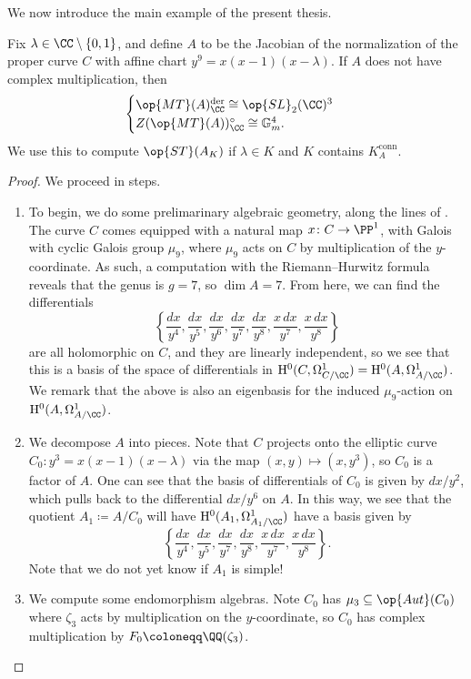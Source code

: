 \documentclass[../thesis.tex]{subfiles}
\begin{document}
We now introduce the main example of the present thesis.
\begin{proposition} \label{prop:generic-fermat-st}
	Fix $\lambda\in\CC\setminus\{0,1\}$, and define $A$ to be the Jacobian of the normalization of the proper curve $C$ with affine chart $y^9=x(x-1)(x-\lambda)$. If $A$ does not have complex multiplication, then
	\[\begin{cases}
		\op{MT}(A)^{\mathrm{der}}_\CC\cong\op{SL}_2(\CC)^3 \\
		Z(\op{MT}(A))^\circ_\CC\cong\mathbb G_m^4.
	\end{cases}\]
	We use this to compute $\op{ST}(A_K)$ if $\lambda\in K$ and $K$ contains $K_A^{\mathrm{conn}}$.
\end{proposition}
\begin{proof}
	We proceed in steps.
	\begin{enumerate}
		\item To begin, we do some prelimarinary algebraic geometry, along the lines of \cite[Section~1]{moonen-special-cyclic-cover}. The curve $C$ comes equipped with a natural map $x\colon C\to\PP^1$, with Galois with cyclic Galois group $\mu_9$, where $\mu_9$ acts on $C$ by multiplication of the $y$-coordinate. As such, a computation with the Riemann--Hurwitz formula reveals that the genus is $g=7$, so $\dim A=7$. From here, we can find the differentials
		\[\left\{\frac{dx}{y^4},\frac{dx}{y^5},\frac{dx}{y^6},\frac{dx}{y^7},\frac{dx}{y^8},\frac{x\,dx}{y^7},\frac{x\,dx}{y^8}\right\}\]
		are all holomorphic on $C$, and they are linearly independent, so we see that this is a basis of the space of differentials in $\mathrm H^0(C,\Omega^1_{C/\CC})=\mathrm H^0(A,\Omega^1_{A/\CC})$. We remark that the above is also an eigenbasis for the induced $\mu_9$-action on $\mathrm H^0(A,\Omega^1_{A/\CC})$.

		\item We decompose $A$ into pieces. Note that $C$ projects onto the elliptic curve $C_0\colon y^3=x(x-1)(x-\lambda)$ via the map $(x,y)\mapsto\left(x,y^3\right)$, so $C_0$ is a factor of $A$. One can see that the basis of differentials of $C_0$ is given by $dx/y^2$, which pulls back to the differential $dx/y^6$ on $A$. In this way, we see that the quotient $A_1\coloneqq A/C_0$ will have $\mathrm H^0(A_1,\Omega^1_{A_1/\CC})$ have a basis given by
		\[\left\{\frac{dx}{y^4},\frac{dx}{y^5},\frac{dx}{y^7},\frac{dx}{y^8},\frac{x\,dx}{y^7},\frac{x\,dx}{y^8}\right\}.\]
		Note that we do not yet know if $A_1$ is simple!

		\item We compute some endomorphism algebras. Note $C_0$ has $\mu_3\subseteq\op{Aut}(C_0)$ where $\zeta_3$ acts by multiplication on the $y$-coordinate, so $C_0$ has complex multiplication by $F_0\coloneqq\QQ(\zeta_3)$.


\end{enumerate}
\end{proof}
\end{document}
